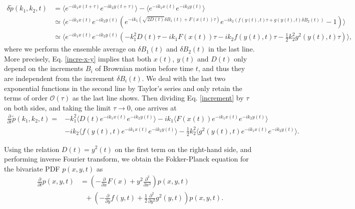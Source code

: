 \documentclass[aps,pre,twocolumn,groupedaddress,longbibliography]{revtex4-2}
\begin{document}
\begin{widetext}
\begin{equation}\label{increment}
\begin{split}
\delta \tilde{p}(k_1,k_2,t)&=\langle e^{-ik_1x(t+\tau)}e^{-ik_2y(t+\tau)}\rangle-\langle e^{-ik_1x(t)}e^{-ik_2y(t)}\rangle\\
&\simeq \langle e^{-ik_1x(t)}e^{-ik_2y(t)}(e^{-ik_1(\sqrt{2D(t)}\delta B_1(t)+F(x(t))\tau)}e^{-ik_2(f(y(t),t)\tau+g(y(t),t)\delta B_2(t))}-1)\rangle\\
&\simeq \langle e^{-ik_1x(t)}e^{-ik_2y(t)}(-k_1^2D(t)\tau-ik_1F(x(t))\tau-ik_2f(y(t),t)\tau-\frac{1}{2}k_2^2g^2(y(t),t)\tau)\rangle,
\end{split}
\end{equation}
where we perform the ensemble average on $\delta B_1(t)$ and $\delta B_2(t)$ in the last line. More precisely, Eq. \eqref{incre-x-y} implies that both $x(t)$, $y(t)$ and $D(t)$ only depend on the increments $B_i$ of Brownian motion before time $t$, and thus they are independent from the increment $\delta B_i(t)$. We deal with the last two exponential functions in the second line by Taylor's series and only retain the terms of order $\mathcal{O}(\tau)$ as the last line shows.
Then dividing Eq. \eqref{increment} by $\tau$ on both sides, and taking the limit $\tau\rightarrow 0$, one arrives at
\begin{equation}
\begin{split}
\frac{\partial}{\partial t}\tilde{p}(k_1,k_2,t)=&-k^2_1\langle D(t)e^{-ik_1x(t)}e^{-ik_2y(t)}\rangle-ik_1\langle F(x(t))e^{-ik_1x(t)}e^{-ik_2y(t)}\rangle\\
&-ik_2\langle f(y(t),t)e^{-ik_1x(t)}e^{-ik_2y(t)}\rangle-\frac{1}{2}k^2_2\langle g^2(y(t),t)e^{-ik_1x(t)}e^{-ik_2y(t)}\rangle.
\end{split}
\end{equation}
\end{widetext}
Using the relation $D(t)=y^2(t)$ on the first term on the right-hand side, and performing inverse Fourier transform, we obtain the Fokker-Planck equation for the bivariate PDF $p(x,y,t)$ as
\begin{equation}\label{FKE2}
\begin{split}
\frac{\partial}{\partial t}p(x,y,t)&=\left(-\frac{\partial}{\partial x}F(x)+y^2\frac{\partial^2}{\partial x^2}\right)p(x,y,t)\\
&~~~+\left(-\frac{\partial}{\partial y}f(y,t)+\frac{1}{2}\frac{\partial^2}{\partial y^2}g^2(y,t)\right)p(x,y,t).
\end{split}
\end{equation}
\end{document}
